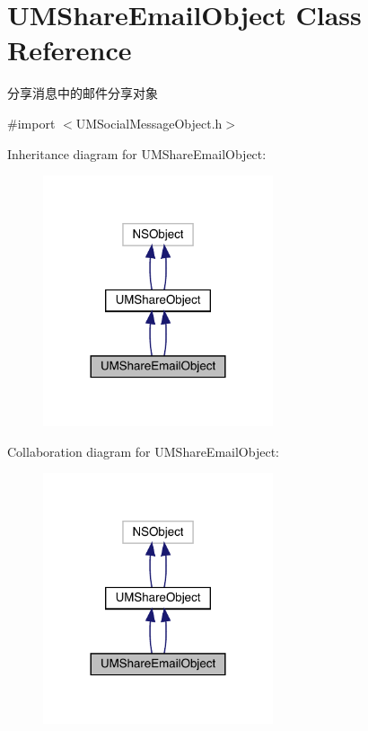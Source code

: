\hypertarget{interface_u_m_share_email_object}{}\section{U\+M\+Share\+Email\+Object Class Reference}
\label{interface_u_m_share_email_object}


分享消息中的邮件分享对象  




{\ttfamily \#import $<$U\+M\+Social\+Message\+Object.\+h$>$}



Inheritance diagram for U\+M\+Share\+Email\+Object\+:\nopagebreak
\begin{figure}[H]
\begin{center}
\leavevmode
\includegraphics[width=192pt]{interface_u_m_share_email_object__inherit__graph}
\end{center}
\end{figure}


Collaboration diagram for U\+M\+Share\+Email\+Object\+:\nopagebreak
\begin{figure}[H]
\begin{center}
\leavevmode
\includegraphics[width=192pt]{interface_u_m_share_email_object__coll__graph}
\end{center}
\end{figure}
